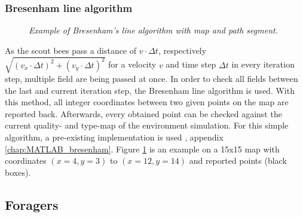 	\subsubsection{Bresenham line algorithm}
		\begin{figure}
			\centering
			\caption{\textit{Example of Bresenham's line algorithm with map and path segment.}}
			\label{fig:bresenham}
		\end{figure}
		As the scout bees pass a distance of $v \cdot \Delta t$, respectively $\sqrt{(v_x \cdot \Delta t)^2 + (v_y \cdot \Delta t)^2}$ for a velocity $v$ and time step $\Delta t$ in every iteration step, multiple field are being passed at once. In order to check all fields between the last and current iteration step, the Bresenham line algorithm is used. With this method, all integer coordinates between two given points on the map are reported back. Afterwards, every obtained point can be checked against the current quality- and type-map of the environment simulation.
		For this simple algorithm, a pre-existing implementation is used \cite{MVTB}, appendix \ref{chap:MATLAB_bresenham}. Figure \ref{fig:bresenham} is an example on a 15x15 map with coordinates $(x = 4, y = 3)$ to $(x = 12, y = 14)$ and reported points (black boxes).
\subsection{Foragers}
